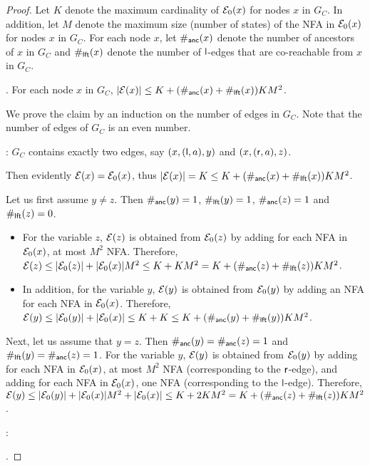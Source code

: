 \begin{proof}
Let $K$ denote the maximum cardinality of $\mathcal{E}_0(x)$ for nodes $x$ in $G_C$. In addition, let $M$ denote the maximum size (number of states) of the NFA in $\mathcal{E}_0(x)$ for nodes $x$ in $G_C$. For each node $x$,  let $\#_{\sf anc}(x)$ denote the number of ancestors of $x$ in $G_C$ and $\#_{\sf lft}(x)$ denote the number of $\mathsf{l}$-edges that are co-reachable from $x$ in $G_C$.

\smallskip

. For each node $x$ in $G_C$, $|\mathcal{E}(x)| \le K+ (\#_{\sf anc}(x) + \#_{\sf lft}(x)) KM^2$.

\smallskip

We prove the claim by an induction on the number of edges in $G_C$. Note that the number of edges of $G_C$ is an even number.


\smallskip


: $G_C$ contains exactly two edges, say $(x, (\mathsf{l},a), y)$ and $(x, (\mathsf{r}, a), z)$. 

Then evidently $\mathcal{E}(x)=\mathcal{E}_0(x)$, thus $|\mathcal{E}(x)| = K \le K+ (\#_{\sf anc}(x) + \#_{\sf lft}(x)) KM^2$.

Let us first assume $y \neq z$. Then $\#_{\sf anc}(y) = 1$, $\#_{\sf lft}(y)=1$, $\#_{\sf anc}(z) = 1$ and $\#_{\sf lft}(z)=0$.
\begin{itemize}
\item For the variable $z$, $\mathcal{E}(z)$ is obtained from $\mathcal{E}_0(z)$ by adding for each NFA in $\mathcal{E}_0(x)$, at most $M^2$ NFA. Therefore, $\mathcal{E}(z) \le |\mathcal{E}_0(z)| + |\mathcal{E}_0(x)| M^2 \le K + KM^2 = K + (\#_{\sf anc}(z)+\#_{\sf lft}(z))KM^2$. 
\item In addition, for the variable $y$, $\mathcal{E}(y)$ is obtained from $\mathcal{E}_0(y)$ by adding an NFA for each NFA in $\mathcal{E}_0(x)$. Therefore, $\mathcal{E}(y) \le |\mathcal{E}_0(y)| + |\mathcal{E}_0(x)|  \le K + K  \le K + (\#_{\sf anc}(y)+\#_{\sf lft}(y)) KM^2$.
\end{itemize}

Next, let us assume that $y = z$. Then $\#_{\sf anc}(y) = \#_{\sf anc}(z)= 1$ and $\#_{\sf lft}(y)=\#_{\sf anc}(z)=1$.
For the variable $y$, $\mathcal{E}(y)$ is obtained from $\mathcal{E}_0(y)$ by adding for each NFA in $\mathcal{E}_0(x)$, at most $M^2$ NFA (corresponding to the $\mathsf{r}$-edge), and adding for each NFA in $\mathcal{E}_0(x)$, one NFA (corresponding to the $\mathsf{l}$-edge).
Therefore, $\mathcal{E}(y) \le |\mathcal{E}_0(y)| + |\mathcal{E}_0(x)| M^2 + |\mathcal{E}_0(x)| \le K + 2KM^2 = K + (\#_{\sf anc}(z)+\#_{\sf lft}(z))KM^2$. 

\smallskip

: 

.

\end{proof}

